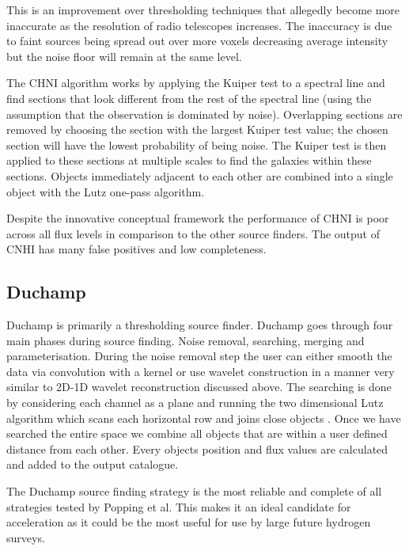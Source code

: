 \documentclass[prodmode,acmtecs]{acmsmall} \usepackage[ruled]{algorithm2e}
\begin{document}
     This is an improvement over thresholding techniques that allegedly become more inaccurate
     as the resolution of radio telescopes increases. The inaccuracy is due to faint sources
     being spread out over more voxels decreasing average intensity but the noise floor will
     remain at the same level. 
     
     The CHNI algorithm works by applying the Kuiper test to a spectral line and find sections 
     that look different from the rest of the spectral line (using the assumption that the
     observation is dominated by noise). Overlapping sections are removed by choosing the 
     section with the largest Kuiper test value; the chosen section will have the lowest probability
     of being noise. The Kuiper test is then applied to these sections at multiple scales to
     find the galaxies within these sections. Objects immediately adjacent to each other
     are combined into a single object with the Lutz one-pass algorithm.
     
     Despite the innovative conceptual framework the performance of CHNI is poor across all
     flux levels in comparison to the other source finders. The output of CNHI has many 
     false positives and low completeness. \cite{popping2012comparison}
     
     \subsection{Duchamp}
Duchamp is primarily a thresholding source finder. Duchamp goes through four main phases during source finding.
Noise removal, searching, merging and parameterisation. During the noise removal step the user can either smooth the data
via convolution with a kernel or use wavelet construction in a manner very similar to 2D-1D wavelet
reconstruction discussed above. The searching is done by considering each channel as a plane and running the two dimensional
Lutz algorithm which scans each horizontal row and joins close objects \cite{lutz1980algorithm}. Once we have searched the entire
space we combine all objects that are within a user defined distance from each other. Every objects position
and flux values are calculated and added to the output catalogue. \cite{whiting2012duchamp}


The Duchamp source finding strategy  is the most reliable and complete of all strategies tested 
by Popping et al. This makes it an ideal candidate for acceleration as it could
be the most useful for use by large future hydrogen surveys. 
\end{document}
